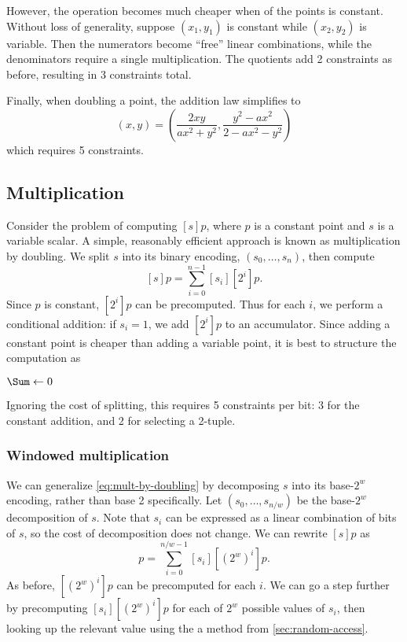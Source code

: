 \documentclass{article}
\begin{document}
However, the operation becomes much cheaper when of the points is constant. Without loss of generality, suppose $(x_1, y_1)$ is constant while $(x_2, y_2)$ is variable. Then the numerators become ``free'' linear combinations, while the denominators require a single multiplication. The quotients add 2 constraints as before, resulting in 3 constraints total.

Finally, when doubling a point, the addition law simplifies to
\begin{equation}
  [2] (x, y) = \left( \frac{2 x y}{a x^2 + y^2}, \frac{y^2 - a x^2}{2 - a x^2 - y^2} \right)
\end{equation}
which requires 5 constraints.


\subsection{Multiplication}

Consider the problem of computing $[s] p$, where $p$ is a constant point and $s$ is a variable scalar. A simple, reasonably efficient approach is known as multiplication by doubling. We split $s$ into its binary encoding, $(s_0, \dots, s_n)$, then compute
\begin{equation} \label{eq:mult-by-doubling}
  [s] p = \sum_{i=0}^{n-1} [s_i] [2^i] p.
\end{equation}
Since $p$ is constant, $[2^i] p$ can be precomputed. Thus for each $i$, we perform a conditional addition: if $s_i = 1$, we add $[2^i] p$ to an accumulator. Since adding a constant point is cheaper than adding a variable point, it is best to structure the computation as
\begin{center}
\begin{algorithm}[H]
  $\Sum \leftarrow 0$\;
  \Return \Sum\;
\end{algorithm}
\end{center}
Ignoring the cost of splitting, this requires 5 constraints per bit: 3 for the constant addition, and 2 for selecting a 2-tuple.


\subsubsection{Windowed multiplication}

We can generalize \autoref{eq:mult-by-doubling} by decomposing $s$ into its base-$2^w$ encoding, rather than base 2 specifically. Let $(s_0, \dots, s_{n/w})$ be the base-$2^w$ decomposition of $s$. Note that $s_i$ can be expressed as a linear combination of bits of $s$, so the cost of decomposition does not change. We can rewrite $[s] p$ as
\begin{equation}
  [s] p = \sum_{i=0}^{n/w-1} [s_i] [(2^w)^i] p.
\end{equation}
As before, $[(2^w)^i] p$ can be precomputed for each $i$. We can go a step further by precomputing $[s_i] [(2^w)^i] p$ for each of $2^w$ possible values of $s_i$, then looking up the relevant value using the a method from \autoref{sec:random-access}.
\end{document}
